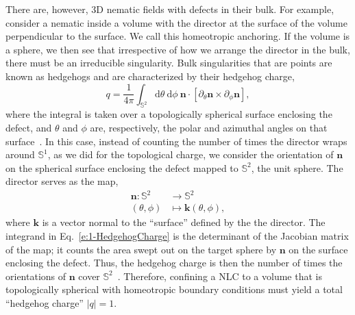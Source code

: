 There are, however, 3D nematic fields with defects in their bulk.
For example, consider a nematic inside a volume with the director at the surface of the volume perpendicular to the surface.
We call this homeotropic anchoring.
If the volume is a sphere, we then see that irrespective of how we arrange the director in the bulk, there must be an irreducible singularity.
Bulk singularities that are points are known as hedgehogs and are characterized by their hedgehog charge,
\begin{equation}
  q = \frac{1}{4 \pi} \int_{\mathbb{S}^2} \textrm{d}\theta \: \textrm{d}\phi \: \mathbf{n} \cdot \left [ \partial_{\theta} \mathbf{n} \times \partial_{\phi} \mathbf{n} \right ],\label{e:1-HedgehogCharge}
\end{equation}
where the integral is taken over a topologically spherical surface enclosing the defect, and $\theta$ and $\phi$ are, respectively, the polar and azimuthal angles on that surface~\cite{RN153}.
In this case, instead of counting the number of times the director wraps around $\mathbb{S}^1$, as we did for the topological charge, we consider the orientation of $\mathbf{n}$ on the spherical surface enclosing the defect mapped to $\mathbb{S}^2$, the unit sphere.
The director serves as the map,
\begin{align}
  \mathbf{n} : \mathbb{S}^2 &\rightarrow \mathbb{S}^2 \nonumber \\
               (\theta, \phi) &\mapsto \mathbf{k}(\theta,\phi), \nonumber
\end{align}
where $\mathbf{k}$ is a vector normal to the ``surface'' defined by the the director.
The integrand in Eq.~\ref{e:1-HedgehogCharge} is the determinant of the Jacobian matrix of the map; it counts the area swept out on the target sphere by $\mathbf{n}$ on the surface enclosing the defect.
Thus, the hedgehog charge is then the number of times the orientations of $\mathbf{n}$ cover $\mathbb{S}^2$~\cite{RN153}.
Therefore, confining a NLC to a volume that is topologically spherical with homeotropic boundary conditions must yield a total ``hedgehog charge'' $|q|=1$.

